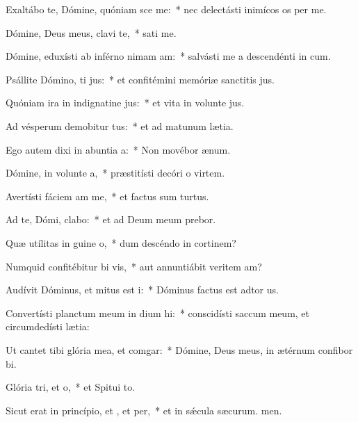 \item Exaltábo te, Dómine, quóniam sce me:~* nec delectásti inimícos os per me.
\item Dómine, Deus meus, clavi  te,~*  sati me.
\item Dómine, eduxísti ab inférno nimam am:~* salvásti me a descendénti in cum.
\item Psállite Dómino, ti jus:~* et confitémini memóriæ sanctitis jus.
\item Quóniam ira in indignatine jus:~* et vita in volunte jus.
\item Ad vésperum demobitur tus:~* et ad matunum lætia.
\item Ego autem dixi in abuntia a:~* Non movébor  ænum.
\item Dómine, in volunte a,~* præstitísti decóri o virtem.
\item Avertísti fáciem am  me,~* et factus sum turtus.
\item Ad te, Dómi, clabo:~* et ad Deum meum prebor.
\item Quæ utílitas in guine o,~* dum descéndo in cortinem?
\item Numquid confitébitur bi vis,~* aut annuntiábit veritem am?
\item Audívit Dóminus, et mitus est i:~* Dóminus factus est adtor us.
\item Convertísti planctum meum in dium hi:~* conscidísti saccum meum, et circumdedísti  lætia:
\item Ut cantet tibi glória mea, et  comgar:~* Dómine, Deus meus, in ætérnum confibor bi.
\item Glória tri, et o,~* et Spitui to.
\item Sicut erat in princípio, et , et per,~* et in sǽcula sæcurum. men.

